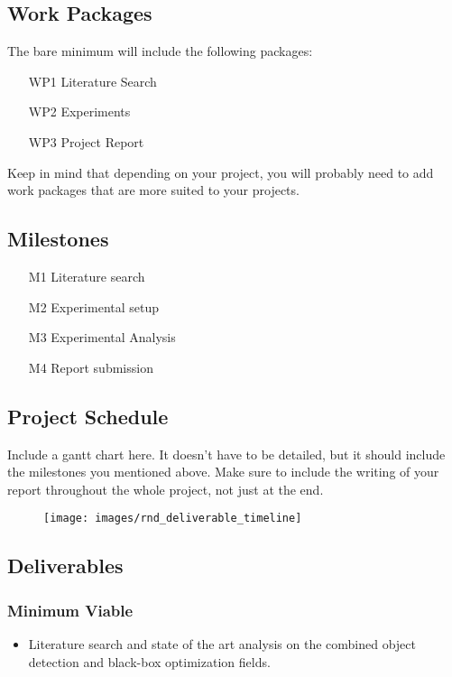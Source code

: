 \documentclass[thesis]{mas_proposal}
\begin{document}
\subsection{Work Packages}
The bare minimum will include the following packages:
\begin{enumerate}
    \item[WP1] Literature Search
    \item[WP2] Experiments
    \item[WP3] Project Report
\end{enumerate}
Keep in mind that depending on your project, you will probably need to add work packages that are more suited to your projects.

\subsection{Milestones}
\begin{enumerate}
    \item[M1] Literature search
    \item[M2] Experimental setup
    \item[M3] Experimental Analysis
    \item[M4] Report submission
\end{enumerate}

\subsection{Project Schedule}
Include a gantt chart here. It doesn't have to be detailed, but it should include the milestones you mentioned above.
Make sure to include the writing of your report throughout the whole project, not just at the end.

\begin{figure}[h!]
    \caption{}
    \texttt{[image: images/rnd\_deliverable\_timeline]}
    \label{}
\end{figure}

\subsection{Deliverables}
\subsubsection*{Minimum Viable}

\begin{itemize}
    \item Literature search and state of the art analysis on the  combined object detection and black-box optimization  fields.

\end{itemize}
\end{document}
